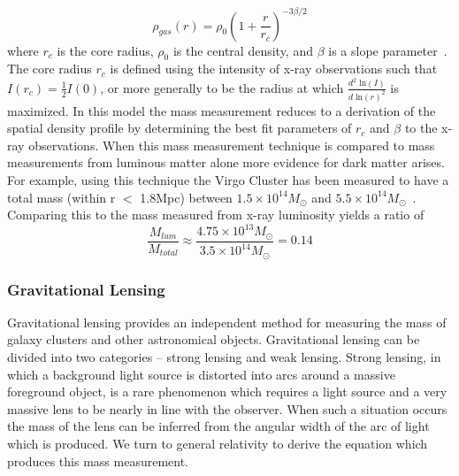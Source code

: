 \begin{equation} \label{HBeta1}
\rho_{gas}(r) = \rho_0 \left(1 + \frac{r}{r_c}\right)^{-3\beta/2}
\end{equation}
where $r_c$ is the core radius, $\rho_0$ is the central density, and $\beta$ is a slope parameter~\cite{Vikhlinin}.  The core radius $r_c$ is defined using the intensity of x-ray observations such that $I(r_c)=\frac{1}{2}I(0)$, or more generally to be the radius at which $\frac{d^2 \; \text{ln}(I)}{d \; \text{ln}(r)^2}$ is maximized. In this model the mass measurement reduces to a derivation of the spatial density profile by determining the best fit parameters of $r_c$ and $\beta$ to the x-ray observations.  When this mass measurement technique is compared to mass measurements from luminous matter alone more evidence for dark matter arises. For example, using this technique the Virgo Cluster has been measured to have a total mass (within r $<$ 1.8Mpc) between $1.5 \times 10^{14} M_{\odot}$ and $5.5 \times10^{14} M_{\odot}$~\cite{Paradijs}. Comparing this to the mass measured from x-ray luminosity yields a ratio of
\begin{equation} \label{betamodelmass}
\frac{M_{lum}}{M_{total}} \approx \frac{4.75 \times 10^{13} M_{\odot}}{3.5 \times 10^{14} M_{\odot}} = 0.14
\end{equation}

\subsubsection{Gravitational Lensing}


Gravitational lensing provides an independent method for measuring the mass of galaxy clusters and other astronomical objects.  Gravitational lensing can be divided into two categories -- strong lensing and weak lensing.  Strong lensing, in which a background light source is distorted into arcs around a massive foreground object, is a rare phenomenon which requires a light source and a very massive lens to be nearly in line with the observer.  When such a situation occurs the mass of the lens can be inferred from the angular width of the arc of light which is produced.  We turn to general relativity to derive the equation which produces this mass measurement.

